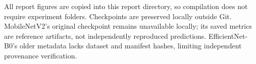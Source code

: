 \documentclass[11pt,a4paper]{article}
\begin{document}
All report figures are copied into this report directory, so compilation does not require experiment folders. Checkpoints are preserved locally outside Git. MobileNetV2's original checkpoint remains unavailable locally; its saved metrics are reference artifacts, not independently reproduced predictions. EfficientNet-B0's older metadata lacks dataset and manifest hashes, limiting independent provenance verification.
\end{document}
